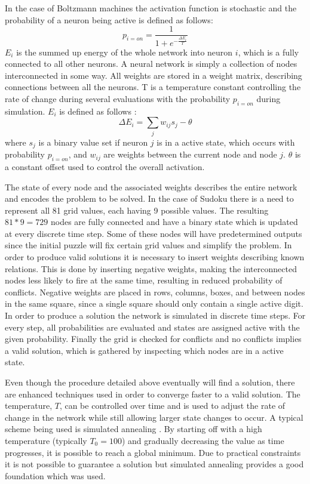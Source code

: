 \documentclass[a4paper,11pt]{kth-mag}
\begin{document}
In the case of Boltzmann machines the activation function is stochastic and the probability of a neuron being active is defined as follows:
\[
p_{i=on} = \frac{1}{1+e^{-\frac{\Delta E_{i}}{T}}}
\]
$E_i$ is the summed up energy of the whole network into neuron $i$, which is a fully connected to all other neurons.
A neural network is simply a collection of nodes interconnected in some way.
All weights are stored in a weight matrix, describing connections between all the neurons.
T is a temperature constant controlling the rate of change during several evaluations with the probability $p_{i=on}$ during simulation.
$E_i$ is defined as follows \cite{boltzmann2}:
\[
\Delta E_{i} = \sum_{j} w_{ij} s_{j} - \theta
\]
where $s_j$ is a binary value set if neuron $j$ is in a active state, which occurs with probability $p_{i=on}$, and $w_{ij}$ are weights between the current node and node $j$. $\theta$ is a constant offset used to control the overall activation.

The state of every node and the associated weights describes the entire network and encodes the problem to be solved.
In the case of Sudoku there is a need to represent all 81 grid values, each having 9 possible values.
The resulting $81*9=729$ nodes are fully connected and have a binary state which is updated at every discrete time step.
Some of these nodes will have predetermined outputs since the initial puzzle will fix certain grid values and simplify the problem.
In order to produce valid solutions it is necessary to insert weights describing known relations.
This is done by inserting negative weights, making the interconnected nodes less likely to fire at the same time, resulting in reduced probability of conflicts.
Negative weights are placed in rows, columns, boxes, and between nodes in the same square, since a single square should only contain a single active digit.\\

In order to produce a solution the network is simulated in discrete time steps.
For every step, all probabilities are evaluated and states are assigned active with the given probability.
Finally the grid is checked for conflicts and no conflicts implies a valid solution, which is gathered by inspecting which nodes are in a active state.

Even though the procedure detailed above eventually will find a solution, there are enhanced techniques used in order to converge faster to a valid solution.
The temperature, $T$, can be controlled over time and is used to adjust the rate of change in the network while still allowing larger state changes to occur.
A typical scheme being used is simulated annealing \cite{simulatedAnnealing}.
By starting off with a high temperature (typically $T_0 = 100$) and gradually decreasing the value as time progresses, it is possible to reach a global minimum.
Due to practical constraints it is not possible to guarantee a solution but simulated annealing provides a good foundation which was used.\\
\end{document}
